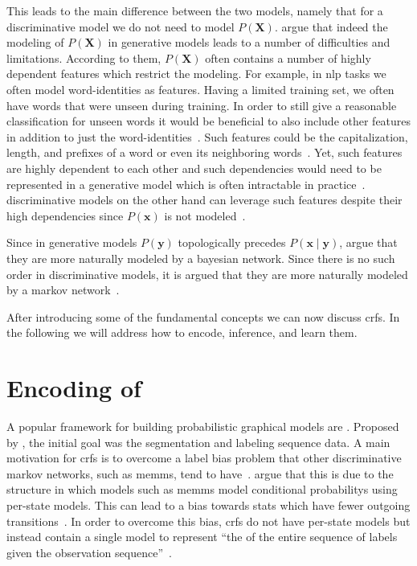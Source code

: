 This leads to the main difference between the two models, namely that for a \gls{discriminative model} we do not need to model $P(\mathbf{X})$.
\citet{sutton2010introduction} argue that indeed the modeling of $P(\mathbf{X})$ in \glspl{generative model} leads to a number of difficulties and limitations.
According to them, $P(\mathbf{X})$ often contains a number of highly dependent features which restrict the modeling.
For example, in \gls{nlp} tasks we often model word-identities as features.
Having a limited training set, we often have words that were unseen during training.
In order to still give a reasonable classification for unseen words it would be beneficial to also include other features in addition to just the word-identities~\citep{sutton2010introduction}.
Such features could be the capitalization, length, and prefixes of a word or even its neighboring words~\citep{sutton2010introduction}.
Yet, such features are highly dependent to each other and such dependencies would need to be represented in a \gls{generative model} which is often intractable in practice~\citep{sutton2010introduction}.
\Glspl{discriminative model} on the other hand can leverage such features despite their high dependencies since $P(\mathbf{x})$ is not modeled~\citep{koller2009probabilistic}.

Since in \glspl{generative model} $P(\mathbf{y})$ topologically precedes $P(\mathbf{x}\mid\mathbf{y})$, \citet{sutton2010introduction} argue that they are more naturally modeled by a \gls{bayesian network}.
Since there is no such order in \glspl{discriminative model}, it is argued that they are more naturally modeled by a \gls{markov network}~\citep{sutton2010introduction}.

\bigskip

After introducing some of the fundamental concepts we can now discuss \glspl{crf}. In the following we will address how to encode, inference, and learn them.

\section{Encoding of }\label{sec:definition-crfs}
A popular framework for building \glspl{probabilistic graphical model} are .
Proposed by \citet{lafferty2001conditional}, the initial goal was the segmentation and labeling sequence data.
A main motivation for \glspl{crf} is to overcome a label bias problem that other discriminative \glspl{markov network}, such as \glspl{memm}, tend to have~\citep{lafferty2001conditional}.
\citet{lafferty2001conditional} argue that this is due to the structure in which models such as \glspl{memm} model \glspl{conditional probability} using per-state models.
This can lead to a bias towards stats which have fewer outgoing transitions~\citep{lafferty2001conditional}.
In order to overcome this bias, \glspl{crf} do not have per-state models but instead contain a single model to represent ``the  of the entire sequence of labels given the observation sequence''~\citep{lafferty2001conditional}.

